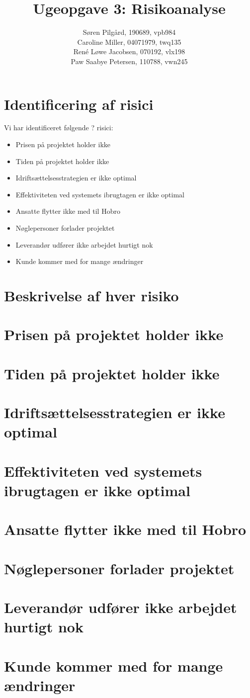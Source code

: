 \documentclass[10pt,a4paper,danish]{article}
\title{Ugeopgave 3: Risikoanalyse}
\author{Søren Pilgård, 190689, vpb984\\
Caroline Miller, 04071979, twq135\\
René Løwe Jacobsen, 070192, vlx198\\
Paw Saabye Petersen, 110788, vwn245}
\begin{document}
\maketitle
\newpage


\section{Identificering af risici}
Vi har identificeret følgende ? risici:
\begin{itemize}
\item Prisen på projektet holder ikke
\item Tiden på projektet holder ikke
\item Idriftsættelsesstrategien er ikke optimal
\item Effektiviteten ved systemets ibrugtagen er ikke optimal
\item Ansatte flytter ikke med til Hobro 
\item Nøglepersoner forlader projektet
\item Leverandør udfører ikke arbejdet hurtigt nok
\item Kunde kommer med for mange ændringer
\end{itemize}

\section{Beskrivelse af hver risiko}
\section{Prisen på projektet holder ikke}
\section{Tiden på projektet holder ikke}
\section{Idriftsættelsesstrategien er ikke optimal}
\section{Effektiviteten ved systemets ibrugtagen er ikke optimal}
\section{Ansatte flytter ikke med til Hobro}
\section{Nøglepersoner forlader projektet}
\section{Leverandør udfører ikke arbejdet hurtigt nok}
\section{Kunde kommer med for mange ændringer}
\end{document}
